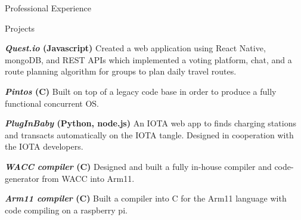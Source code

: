\documentclass[10pt]{resume} %
\begin{document}
\begin{rSection}{Professional Experience}
%
%
%
%

\end{rSection}


\begin{rSection}{Projects}
    \item \textbf{\textit{Quest.io} (Javascript)} Created a web application
    using React Native, mongoDB, and REST APIs which implemented a voting
    platform, chat, and a route planning algorithm for groups to plan daily
    travel routes.
    \item \textbf{\textit{Pintos} (C)} Built on top of a legacy code base in
    order to produce a fully functional concurrent OS.
    \item \textbf{\textit{PlugInBaby} (Python, node.js)} An IOTA web app
    to finds charging stations and transacts automatically on the IOTA tangle.
    Designed in cooperation with the IOTA developers.
    \item \textbf{\textit{WACC compiler} (C)} Designed and built a fully
    in-house compiler and code-generator from WACC into Arm11.
    \item \textbf{\textit{Arm11 compiler} (C)} Built a compiler into C for the
    Arm11 language with code compiling on a raspberry pi.
\end{rSection}
\end{document}
